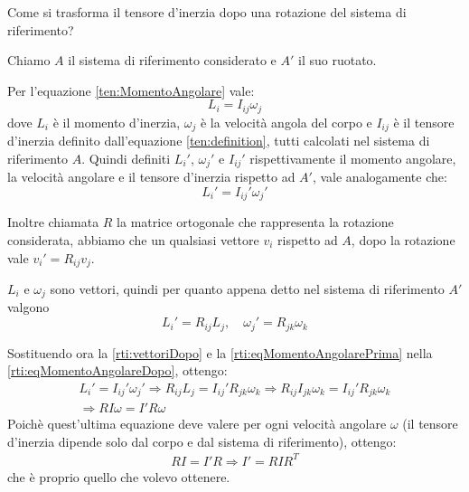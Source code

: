 \documentclass[../main.tex]{subfiles}
\begin{document}
\label{ex:rti}

\textex
Come si trasforma il tensore d'inerzia dopo una rotazione del sistema di riferimento?

\solution
Chiamo $A$ il sistema di riferimento considerato e $A'$ il suo ruotato.

Per l'equazione \cref{ten:MomentoAngolare} vale:
\begin{equation} \label{rti:eqMomentoAngolarePrima}
	L_i=I_{ij}\omega_j
\end{equation}
dove $L_i$ è il momento d'inerzia, $\omega_j$ è la velocità angola del corpo e $I_{ij}$ è il tensore d'inerzia definito dall'equazione \cref{ten:definition}, tutti calcolati nel sistema di riferimento $A$. Quindi definiti $L_i'$, $\omega_j'$ e $I_{ij}'$ rispettivamente il momento angolare, la velocità angolare e il tensore d'inerzia rispetto ad $A'$, vale analogamente che:
\begin{equation}\label{rti:eqMomentoAngolareDopo}
	L_i'=I_{ij}'\omega_j'
\end{equation}

Inoltre chiamata $R$ la matrice ortogonale che rappresenta la rotazione considerata, abbiamo che un qualsiasi vettore $v_i$ rispetto ad $A$, dopo la rotazione vale $v_i'=R_{ij}v_j$.

$L_i$ e $\omega_j$ sono vettori, quindi per quanto appena detto nel sistema di riferimento $A'$ valgono
\begin{equation}\label{rti:vettoriDopo}
	L_i'=R_{ij}L_j, \quad \omega_j'=R_{jk}\omega_k
\end{equation}

Sostituendo ora la \cref{rti:vettoriDopo} e la \cref{rti:eqMomentoAngolarePrima} nella \cref{rti:eqMomentoAngolareDopo}, ottengo:
\begin{gather*}
	L_i'=I_{ij}'\omega_j' \Longrightarrow R_{ij}L_j=I_{ij}'R_{jk}\omega_k \Longrightarrow R_{ij}I_{jk}\omega_k=I_{ij}'R_{jk}\omega_k \\
	\Longrightarrow RI\omega=I'R\omega
\end{gather*}
Poichè quest'ultima equazione deve valere per ogni velocità angolare $\omega$ (il tensore d'inerzia dipende solo dal corpo e dal sistema di riferimento), ottengo:
\begin{gather*}
	RI=I'R \Longrightarrow I'=RIR^{T}
\end{gather*}
che è proprio quello che volevo ottenere.
\end{document}
